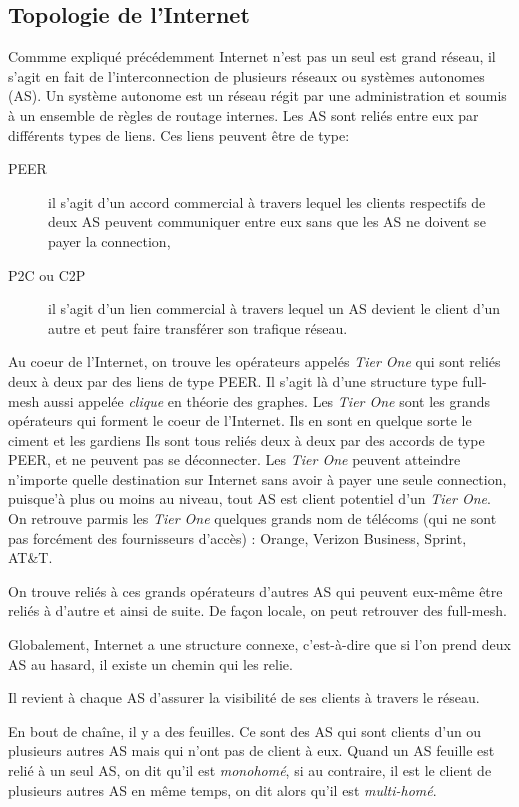 

%

\subsection{Topologie de l'Internet}
\par
Commme expliqu\'e pr\'ec\'edemment Internet n'est pas un seul est grand r\'eseau, il s'agit en fait de l'interconnection de plusieurs r\'eseaux ou syst\`emes autonomes (AS). Un syst\`eme autonome est un r\'eseau r\'egit par une administration et soumis \`a un ensemble de r\`egles de routage internes. Les AS sont reli\'es entre eux par diff\'erents types de liens. Ces liens peuvent \^etre de type:
\begin{description}
 \item[PEER] il s'agit d'un accord commercial \`a travers lequel les clients respectifs de deux AS peuvent communiquer entre eux sans que les AS ne doivent se payer la connection,
 \item[P2C ou C2P] il s'agit d'un lien commercial \`a travers lequel un AS devient le client d'un autre et peut faire transf\'erer son trafique r\'eseau.
\end{description}
\par
Au coeur de l'Internet, on trouve les op\'erateurs appel\'es \textit{Tier One} qui sont reli\'es deux \`a deux par des liens de type PEER. Il s'agit l\`a d'une structure type full-mesh aussi appel\'ee \textit{clique} en th\'eorie des graphes. Les \textit{Tier One} sont les grands op\'erateurs qui forment le coeur de l'Internet. Ils en sont en quelque sorte le ciment et les gardiens Ils sont tous reli\'es deux \`a deux par des accords de type PEER, et ne peuvent pas se d\'econnecter. Les \textit{Tier One} peuvent atteindre n'importe quelle destination sur Internet sans avoir \`a payer une seule connection, puisque'\`a plus ou moins au niveau, tout AS est client potentiel d'un \textit{Tier One}. On retrouve parmis les \textit{Tier One} quelques grands nom de télécoms (qui ne sont pas forcément des fournisseurs d'acc\`es) : Orange, Verizon Business, Sprint, AT\&T.
\par
On trouve reli\'es \`a ces grands op\'erateurs d'autres AS qui peuvent eux-m\^eme \^etre reli\'es \`a d'autre et ainsi de suite. De fa\c con locale, on peut retrouver des full-mesh.
\par
Globalement, Internet a une structure connexe, c'est-\`a-dire que si l'on prend deux AS au hasard, il existe un chemin qui les relie.
\par
Il revient \`a chaque AS d'assurer la visibilit\'e de ses clients \`a travers le r\'eseau.
\par
En bout de cha\^ine, il y a des feuilles. Ce sont des AS qui sont clients d'un ou plusieurs autres AS mais qui n'ont pas de client \`a eux. Quand un AS feuille est reli\'e \`a un seul AS, on dit qu'il est \textit{monohom\'e}, si au contraire, il est le client de plusieurs autres AS en m\^eme temps, on dit alors qu'il est \textit{multi-hom\'e}.



